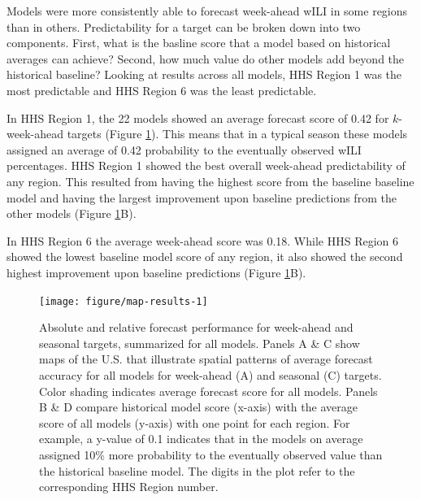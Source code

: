 \documentclass{article}\usepackage[]{graphicx}\usepackage[]{color}
\newenvironment{knitrout}{}{} %
\begin{document}
Models were more consistently able to forecast week-ahead wILI in some regions than in others.
Predictability for a target can be broken down into two components. First, what is the basline score that a model based on historical averages can achieve? Second, how much value do other models add beyond the historical baseline? 
Looking at results across all models,
HHS Region 1 was the most predictable and HHS Region 6 was the least predictable.

In HHS Region 1, the 22 models showed an average forecast score of 0.42 for $k$-week-ahead targets (Figure \ref{fig:map-results}). 
This means that in a typical season these models assigned an average of 0.42 probability to the eventually observed wILI percentages.
HHS Region 1 showed the best overall week-ahead predictability of any region. 
This resulted from having the highest score from the baseline baseline model and having the largest improvement upon baseline predictions from the other models (Figure \ref{fig:map-results}B).  

In HHS Region 6 the average week-ahead score was 0.18. 
While HHS Region 6 showed the lowest baseline model score of any region, it also showed the second highest improvement upon baseline predictions (Figure \ref{fig:map-results}B).



\begin{knitrout}
\color{fgcolor}\begin{figure}
\texttt{[image: figure/map-results-1]} \caption[Absolute and relative forecast performance for week-ahead and seasonal targets, summarized for all models]{Absolute and relative forecast performance for week-ahead and seasonal targets, summarized for all models. Panels A \& C show maps of the U.S. that illustrate spatial patterns of average forecast accuracy for all models for week-ahead (A) and seasonal (C) targets. Color shading indicates average forecast score for all models. Panels B \& D compare historical model score (x-axis) with the average score of all models (y-axis) with one point for each region. For example, a y-value of 0.1 indicates that in the models on average assigned 10\% more probability to the eventually observed value than the historical baseline model. The digits in the plot refer to the corresponding HHS Region number.}\label{fig:map-results}
\end{figure}


\end{knitrout}
\end{document}
